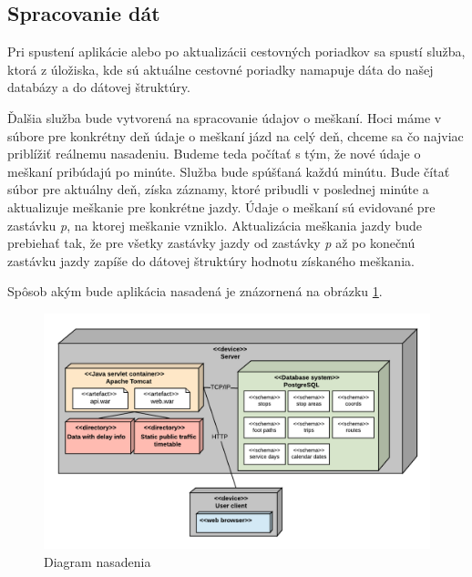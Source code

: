 \subsection{Spracovanie dát}
Pri spustení aplikácie alebo po aktualizácii cestovných poriadkov sa spustí služba, ktorá z úložiska, kde sú aktuálne cestovné poriadky namapuje dáta do našej databázy a do dátovej štruktúry. 

Ďalšia služba bude vytvorená na spracovanie údajov o meškaní. Hoci máme v súbore pre konkrétny deň údaje o meškaní jázd na celý deň, chceme sa čo najviac priblížiť reálnemu nasadeniu. Budeme teda počítať s tým, že nové údaje o meškaní pribúdajú po minúte. Služba bude spúšťaná každú minútu. Bude čítať súbor pre aktuálny deň, získa záznamy, ktoré pribudli v poslednej minúte a aktualizuje meškanie pre konkrétne jazdy. Údaje o meškaní sú evidované pre zastávku \textit{p}, na ktorej meškanie vzniklo. Aktualizácia meškania jazdy bude prebiehať tak, že pre všetky zastávky jazdy od zastávky \textit{p} až po konečnú zastávku jazdy zapíše do dátovej štruktúry hodnotu získaného meškania.

Spôsob akým bude aplikácia nasadená je znázornená na obrázku \ref{fig:deploymentDiagram}.

\begin{figure}[H]
\centerline{\includegraphics[width=1.0\textwidth]{images/deployment-diagram}}
\caption[Diagram nasadenia]{Diagram nasadenia}
\label{fig:deploymentDiagram}
\end{figure}




